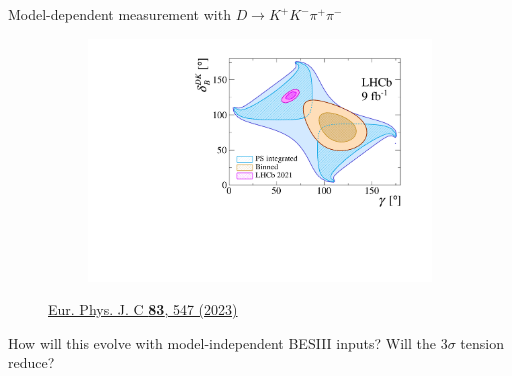 \documentclass{beamer}
\begin{document}
\begin{frame}{Model-dependent measurement with $D\to K^+K^-\pi^+\pi^-$}
\begin{figure}[htb]
\begin{subfigure}{0.5\textwidth}
      \includegraphics[width=1\textwidth]{Plots/gammacharm_lhcb_KKpipi_GLW_KKpipi_GGSZ_lhcb_2020_beauty_and_charm_g_d_dk_ModelDependent.pdf}
    \end{subfigure}
    \vspace{-0.5cm}
    \caption*{\tiny\href{https://link.springer.com/article/10.1140/epjc/s10052-023-11560-5}{Eur. Phys. J. C \textbf{83}, 547 (2023)}}
  \end{figure}
  \vspace{-0.5cm}
  \begin{center}
    {\large How will this evolve with model-independent BESIII inputs? Will the $3\sigma$ tension reduce?}
  \end{center}
\end{frame}
\end{document}
